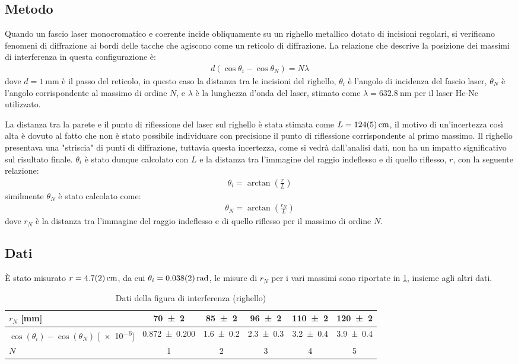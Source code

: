 \documentclass[a4paper]{article}
\begin{document}
\subsection{Metodo}
Quando un fascio laser monocromatico e coerente incide obliquamente su un righello metallico dotato di incisioni regolari, si verificano fenomeni di diffrazione ai bordi delle tacche che agiscono come un reticolo di diffrazione. La relazione che descrive la posizione dei massimi di interferenza in questa configurazione è: 
\begin{align}
    d(\cos\theta_i - \cos\theta_N) = N\lambda
\end{align}
dove $d=\SI{1}{\milli\meter}$ è il passo del reticolo, in questo caso la distanza tra le incisioni del righello, $\theta_i$ è l'angolo di incidenza del fascio laser, $\theta_N$ è l'angolo corrispondente al massimo di ordine $N$, e $\lambda$ è la lunghezza d'onda del laser, stimato come $\lambda=\SI{632.8}{\nano\meter}$ per il laser He-Ne utilizzato.

La distanza tra la parete e il punto di riflessione del laser sul righello è stata stimata come $L=\SI{124 \pm 5}{\centi\meter}$, il motivo di un'incertezza così alta è dovuto al fatto che non è stato possibile individuare con precisione il punto di riflessione corrispondente al primo massimo. Il righello presentava una "striscia" di punti di diffrazione, tuttavia questa incertezza, come si vedrà dall'analisi dati, non ha un impatto significativo sul risultato finale. $\theta_i$ è stato dunque calcolato con $L$ e la distanza tra l'immagine del raggio indeflesso e di quello riflesso, $r$, con la seguente relazione:
\begin{align}   
    \theta_i = \arctan\left(\frac{r}{L}\right)
\end{align}
similmente $\theta_N$ è stato calcolato come:
\begin{align}
    \theta_N = \arctan\left(\frac{r_N}{L}\right)
\end{align}
dove $r_N$ è la distanza tra l'immagine del raggio indeflesso e di quello riflesso per il massimo di ordine $N$.
\subsection{Dati}
È stato misurato $r=\SI{4.7 \pm 0.2}{\centi\meter}$, da cui $\theta_i=\SI{0.038 \pm 0.002}{\radian}$, le misure di $r_N$ per i vari massimi sono riportate in \cref{tab:interferenza-righello}, insieme agli altri dati.

\begin{table}[htbp]
\caption{Dati della figura di interferenza (righello)}
\label{tab:interferenza-righello}
\centering
\begin{tabular}{|l|ccccc|}
\hline
$r_N$ [\si{\milli\meter}] & \num{70 \pm 2} & \num{85 \pm 2} & \num{96 \pm 2} & \num{110 \pm 2} & \num{120 \pm 2} \\\hline
$\cos(\theta_i) - \cos(\theta_N)$ [\num{e-6}] & \num{0.872 \pm 0.200} & \num{1.6 \pm 0.2} & \num{2.3 \pm 0.3} & \num{3.2 \pm 0.4} & \num{3.9 \pm 0.4} \\\hline
$N$ & 1 & 2 & 3 & 4 & 5 \\\hline
\end{tabular}
\end{table}
\end{document}
